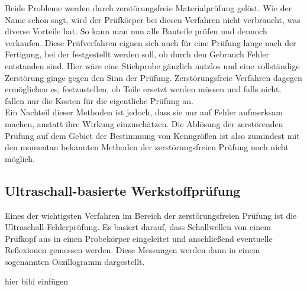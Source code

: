 \documentclass[reducespace,stylepage,semiarbeit]{spezidoc}
\begin{document}
Beide Probleme werden durch zerstörungsfreie Materialprüfung gelöst. 
Wie der Name schon sagt, wird der Prüfkörper bei diesen Verfahren nicht verbraucht, was diverse Vorteile hat. 
So kann man nun alle Bauteile prüfen und dennoch verkaufen. 
Diese Prüfverfahren eignen sich auch für eine Prüfung lange nach der Fertigung, bei der festgestellt werden soll, ob durch den Gebrauch Fehler entstanden sind. 
Hier wäre eine Stichprobe gänzlich nutzlos und eine vollständige Zerstörung ginge gegen den Sinn der Prüfung. 
Zerstörungsfreie Verfahren dagegen ermöglichen es, festzustellen, ob Teile ersetzt werden müssen und falls nicht, fallen nur die Kosten für die eigentliche Prüfung an.\\
Ein Nachteil dieser Methoden ist jedoch, dass sie nur auf Fehler aufmerksam machen, anstatt ihre Wirkung einzuschätzen. 
Die Ablösung der zerstörenden Prüfung auf dem Gebiet der Bestimmung von Kenngrößen ist also zumindest mit den momentan bekannten Methoden der zerstörungsfreien Prüfung noch nicht möglich.

\subsection{Ultraschall-basierte Werkstoffprüfung}
Eines der wichtigsten Verfahren im Bereich der zerstörungsfreien Prüfung ist die Ultraschall-Fehlerprüfung. 
Es basiert darauf, dass Schallwellen von einem Prüfkopf aus in einen Probekörper eingeleitet und anschließend eventuelle Reflexionen gemessen werden. 
Diese Messungen werden dann in einem sogenannten Oszillogramm dargestellt.

hier bild einfügen\\
\end{document}
